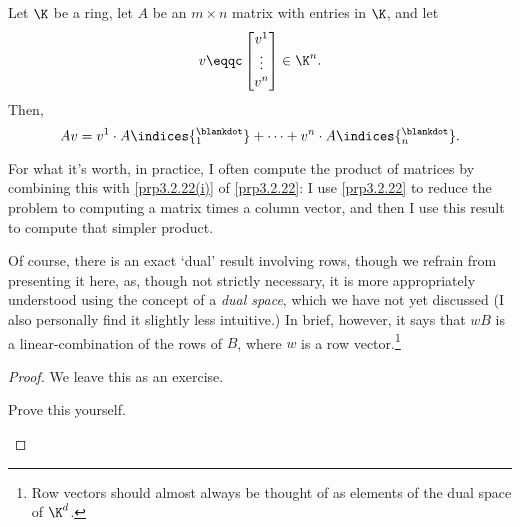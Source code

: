 \begin{prp}{}{}
	Let $\K$ be a ring, let $A$ be an $m\times n$ matrix with entries in $\K$, and let
	\begin{equation}
		v\eqqc \begin{bmatrix}v^1 \\ \vdots \\ v^n\end{bmatrix}\in \K ^n.
	\end{equation}
	Then,
	\begin{equation}\label{eqn3.2.30}
		Av=v^1\cdot A\indices{^{\blankdot}_1}+\cdots +v^n\cdot A\indices{^{\blankdot}_n}.
	\end{equation}
	\begin{rmk}
		For what it's worth, in practice, I often compute the product of matrices by combining this with \cref{prp3.2.22(i)} of \cref{prp3.2.22}:  I use \cref{prp3.2.22} to reduce the problem to computing a matrix times a column vector, and then I use this result to compute that simpler product.
	\end{rmk}
	\begin{rmk}
		Of course, there is an exact `dual' result involving rows, though we refrain from presenting it here, as, though not strictly necessary, it is more appropriately understood using the concept of a \emph{dual space}, which we have not yet discussed  (I also personally find it slightly less intuitive.)  In brief, however, it says that $wB$ is a linear-combination of the rows of $B$, where $w$ is a row vector.\footnote{Row vectors should almost always be thought of as elements of the dual space of $\K ^d$.}
	\end{rmk}
	\begin{proof}
		We leave this as an exercise.
		\begin{exr}[breakable=false]{}{}
			Prove this yourself.
		\end{exr}
	\end{proof}
\end{prp}

